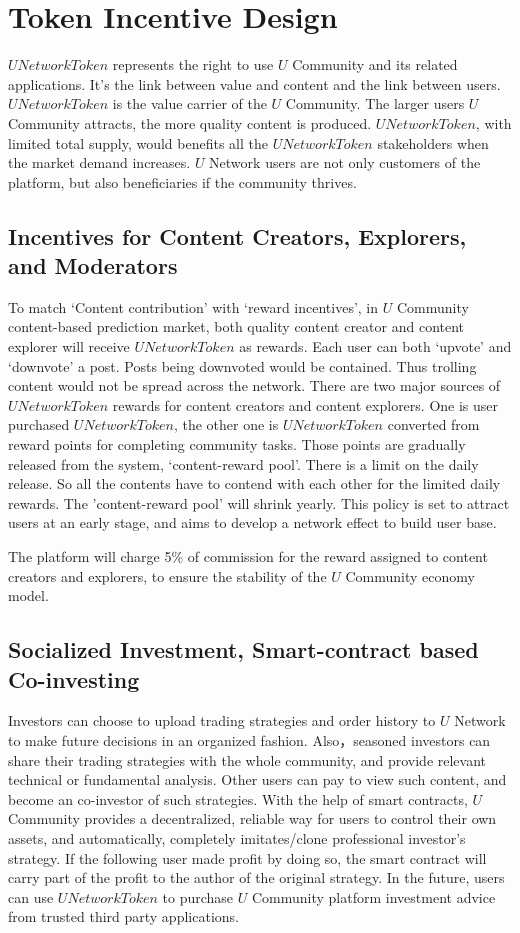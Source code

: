 \section{Token Incentive Design}
$UNetworkToken$ represents the right to use $U$ Community and its related applications. It's the link between value and content and the link between users.
$UNetworkToken$ is the value carrier of the $U$ Community. The larger users $U$ Community attracts, the more quality content is produced. $UNetworkToken$, with limited total supply, would benefits all the $UNetworkToken$ stakeholders when the market demand increases.  
$U$ Network users are not only customers of the platform, but also beneficiaries if the community thrives. 
	
\subsection{Incentives for Content Creators, Explorers, and Moderators} 
To match `Content contribution' with `reward incentives', in $U$ Community content-based prediction market, both quality content creator and content explorer will receive $UNetworkToken$ as rewards.
Each user can both `upvote' and `downvote' a post. Posts being downvoted would be contained. Thus trolling content would not be spread across the network. 
There are two major sources of $UNetworkToken$ rewards for content creators and content explorers. One is user purchased $UNetworkToken$, the other one is $UNetworkToken$ converted from reward points  for completing community tasks.
Those points are gradually released from the system, `content-reward pool'. There is a limit on the daily release. So all the contents have to contend with each other for the limited daily rewards. The 'content-reward pool' will shrink yearly. This policy is set to attract users at an early stage, and aims to develop a network effect to build user base. \par
The platform will charge 5\% of commission for the reward assigned to content creators and explorers, to ensure the stability of the $U$ Community economy model.
\subsection{Socialized Investment, Smart-contract based Co-investing}
Investors can choose to upload trading strategies and order history to $U$ Network to make future decisions in an organized fashion. Also，seasoned investors can share their trading strategies with the whole community, and provide relevant technical or fundamental analysis. Other users can pay to view such content, and become an co-investor of such strategies. With the help of smart contracts, $U$ Community provides a decentralized, reliable way for users to control their own assets, and automatically, completely imitates/clone professional investor's strategy. If the following user made profit by doing so, the smart contract will carry part of the profit to the author of the original strategy. 
In the future, users can use $UNetworkToken$ to purchase $U$ Community platform investment advice from trusted third party applications. 
